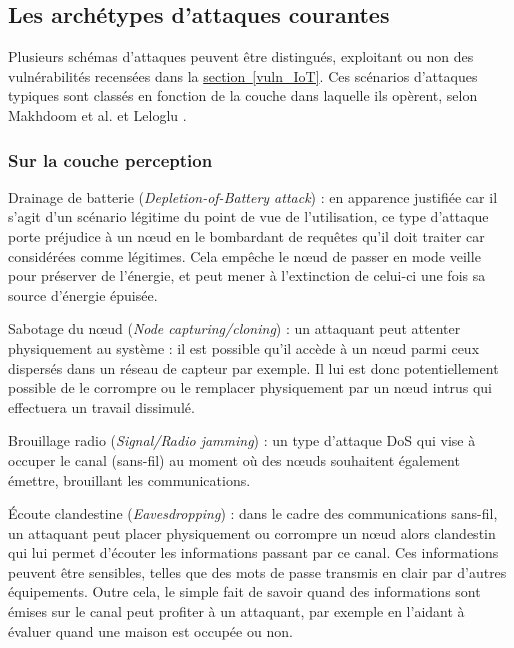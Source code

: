 \documentclass[]{article}
\newcommand{\wordlink}[2]{\hyperref[#1]{#2~\ref{#1}}}
\begin{document}
\newpage
\subsection{Les archétypes d'attaques courantes}

Plusieurs schémas d'attaques peuvent être distingués, exploitant ou non des vulnérabilités recensées dans la \wordlink{vuln_IoT}{section}. Ces scénarios d'attaques typiques sont classés en fonction de la couche dans laquelle ils opèrent, selon Makhdoom et al. \cite{Makhdoom2018} et Leloglu \cite{Leloglu2017}.


\subsubsection{Sur la couche perception}

\par Drainage de batterie (\textit{Depletion-of-Battery attack}) : en apparence justifiée car il s'agit d'un scénario légitime du point de vue de l'utilisation, ce type d'attaque porte préjudice à un nœud en le bombardant de requêtes qu'il doit traiter car considérées comme légitimes. Cela empêche le nœud de passer en mode veille pour préserver de l'énergie, et peut mener à l'extinction de celui-ci une fois sa source d'énergie épuisée.\\

\par Sabotage du nœud (\textit{Node capturing/cloning}) : un attaquant peut attenter physiquement au système : il est possible qu'il accède à un nœud parmi ceux dispersés dans un réseau de capteur par exemple. Il lui est donc potentiellement possible de le corrompre ou le remplacer physiquement par un nœud intrus qui effectuera un travail dissimulé.\\

\par Brouillage radio (\textit{Signal/Radio jamming}) : un type d'attaque DoS qui vise à occuper le canal (sans-fil) au moment où des nœuds souhaitent également émettre, brouillant les communications.\\

\par Écoute clandestine (\textit{Eavesdropping}) : dans le cadre des communications sans-fil, un attaquant peut placer physiquement ou corrompre un nœud alors clandestin qui lui permet d'écouter les informations passant par ce canal. Ces informations peuvent être sensibles, telles que des mots de passe transmis en clair par d'autres équipements. Outre cela, le simple fait de savoir quand des informations sont émises sur le canal peut profiter à un attaquant, par exemple en l'aidant à évaluer quand une maison est occupée ou non.\\
\end{document}
